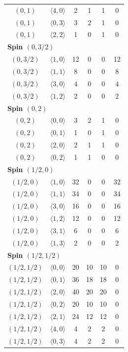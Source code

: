 \begin{longtable}{c c c c c c}
$(0,1)$ & $\langle 4,0\rangle$ & 2 & 1 & 1 & 0 \\
$(0,1)$ & $\langle 0,3\rangle$ & 3 & 2 & 1 & 0 \\
$(0,1)$ & $\langle 2,2\rangle$ & 1 & 0 & 1 & 0 \\
\midrule
\multicolumn{6}{l}{\textbf{Spin $(0,3/2)$}}\\
$(0,3/2)$ & $\langle 1,0\rangle$ & 12 & 0 & 0 & 12 \\
$(0,3/2)$ & $\langle 1,1\rangle$ & 8 & 0 & 0 & 8 \\
$(0,3/2)$ & $\langle 3,0\rangle$ & 4 & 0 & 0 & 4 \\
$(0,3/2)$ & $\langle 1,2\rangle$ & 2 & 0 & 0 & 2 \\
\midrule
\multicolumn{6}{l}{\textbf{Spin $(0,2)$}}\\
$(0,2)$ & $\langle 0,0\rangle$ & 3 & 2 & 1 & 0 \\
$(0,2)$ & $\langle 0,1\rangle$ & 1 & 0 & 1 & 0 \\
$(0,2)$ & $\langle 2,0\rangle$ & 2 & 1 & 1 & 0 \\
$(0,2)$ & $\langle 0,2\rangle$ & 1 & 1 & 0 & 0 \\
\midrule
\multicolumn{6}{l}{\textbf{Spin $(1/2,0)$}}\\
$(1/2,0)$ & $\langle 1,0\rangle$ & 32 & 0 & 0 & 32 \\
$(1/2,0)$ & $\langle 1,1\rangle$ & 34 & 0 & 0 & 34 \\
$(1/2,0)$ & $\langle 3,0\rangle$ & 16 & 0 & 0 & 16 \\
$(1/2,0)$ & $\langle 1,2\rangle$ & 12 & 0 & 0 & 12 \\
$(1/2,0)$ & $\langle 3,1\rangle$ & 6 & 0 & 0 & 6 \\
$(1/2,0)$ & $\langle 1,3\rangle$ & 2 & 0 & 0 & 2 \\
\midrule
\multicolumn{6}{l}{\textbf{Spin $(1/2,1/2)$}}\\
$(1/2,1/2)$ & $\langle 0,0\rangle$ & 20 & 10 & 10 & 0 \\
$(1/2,1/2)$ & $\langle 0,1\rangle$ & 36 & 18 & 18 & 0 \\
$(1/2,1/2)$ & $\langle 2,0\rangle$ & 40 & 20 & 20 & 0 \\
$(1/2,1/2)$ & $\langle 0,2\rangle$ & 20 & 10 & 10 & 0 \\
$(1/2,1/2)$ & $\langle 2,1\rangle$ & 24 & 12 & 12 & 0 \\
$(1/2,1/2)$ & $\langle 4,0\rangle$ & 4 & 2 & 2 & 0 \\
$(1/2,1/2)$ & $\langle 0,3\rangle$ & 4 & 2 & 2 & 0 \\

\end{longtable}
